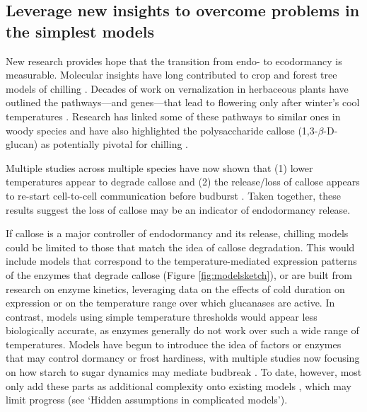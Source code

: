 \documentclass[11pt]{article}
\newcommand{\R}[1]{\label{#1}\linelabel{#1}}
\begin{document}
\subsection*{Leverage new insights to overcome problems in the simplest models}\R{r2terms1}
New research provides hope that the transition from endo- to ecodormancy is measurable. Molecular insights have long contributed to crop and forest tree models of chilling \citep{chuinearees}. Decades of work on vernalization  in \R{r1annual}herbaceous plants have outlined the pathways---and genes---that lead to flowering only after winter's cool temperatures \citep[Figure \ref{fig:modelsketch},][]{Wilczek:2009oa,kim2020current}.\R{r1morecentcite} Research has linked some of these pathways to similar ones in woody species and have also highlighted the polysaccharide callose (1,3-$\beta$-{\sc D}-glucan) as potentially pivotal for chilling \citep{vanderschoot2014,pan2023epigenetic}. 

Multiple studies across multiple species have now shown that (1) lower temperatures appear to degrade callose and (2) the release/loss of callose appears to re-start cell-to-cell communication before budburst \citep{vanderschoot2014,pandey2026variable}. Taken together, these results suggest the loss of callose may be an indicator of endodormancy release. 

If callose is a major controller of endodormancy and its release, chilling models could be limited to those that match the idea of callose degradation. This would include models that correspond to the temperature-mediated expression patterns of the enzymes that degrade callose (Figure \ref{fig:modelsketch}), or are built from research on enzyme kinetics, leveraging data on the effects of cold duration on expression \citep{rinne2011} or on the temperature range over which glucanases are active. In contrast, models using simple temperature thresholds \citep[e.g., all days below 5\degree C equally allow chilling,][]{cannell1983thermal} would appear less biologically accurate, as enzymes generally do not work over such a wide range of temperatures. \R{r2DBFS}Models have begun to introduce the idea of factors or enzymes that may control dormancy or frost hardiness, with multiple studies now focusing on how starch to sugar dynamics may mediate budbreak \citep[][]{charrier2018dynamic,sperling2019predicting}. To date, however, most only add these parts as additional complexity onto existing models %
\citep{caspersen2025contrasting,charrier2018dynamic}, which may limit progress (see `Hidden assumptions in complicated models').\R{r2DBFE}
\end{document}
